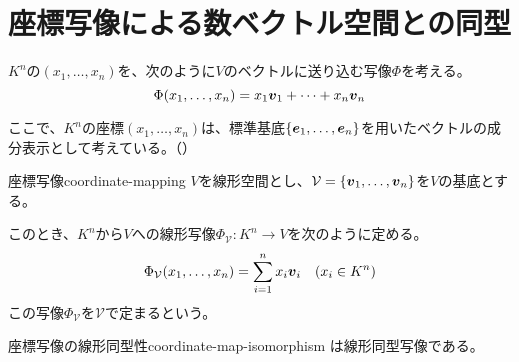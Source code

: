 \documentclass[../../../topic_linear-algebra]{subfiles}
\begin{document}
\sectionline
\section{座標写像による数ベクトル空間との同型}

$K^n$の$(x_1,\dots,x_n)$を、次のように$V$のベクトルに送り込む写像$\Phi$を考える。
\begin{equation*}
  \Phi(x_1,\dots,x_n) = x_1 \vb*{v}_1 + \cdots + x_n \vb*{v}_n
\end{equation*}

ここで、$K^n$の座標$(x_1,\dots,x_n)$は、標準基底$\{ \vb*{e}_1, \dots, \vb*{e}_n \}$を用いたベクトルの成分表示として考えている。（）

\begin{definition}{座標写像}{coordinate-mapping}
  $V$を線形空間とし、$\mathcal{V} = \{ \vb*{v}_1, \dots, \vb*{v}_n \}$を$V$の基底とする。

  このとき、$K^n$から$V$への線形写像$\Phi_{\mathcal{V}}\colon K^n \to V$を次のように定める。
  \begin{equation*}
    \Phi_{\mathcal{V}}(x_1,\dots,x_n) = \sum_{i=1}^n x_i \vb*{v}_i \quad (x_i \in K^n)
  \end{equation*}
  この写像$\Phi_{\mathcal{V}}$を$\mathcal{V}$で定まるという。
\end{definition}

\begin{theorem}{座標写像の線形同型性}{coordinate-map-isomorphism}
  は線形同型写像である。
\end{theorem}
\end{document}
